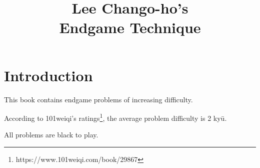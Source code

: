 \title{Lee Chango-ho's\\Endgame Technique}

\chapter*{Introduction}%
\thispagestyle{empty}%
This book contains \countproblems{} endgame problems of increasing difficulty.

According to 101weiqi's ratings\footnote{https://www.101weiqi.com/book/29867}, the average problem difficulty is 2 ky\=u.

All problems are black to play.

\renderproblems
\rendersolutions


